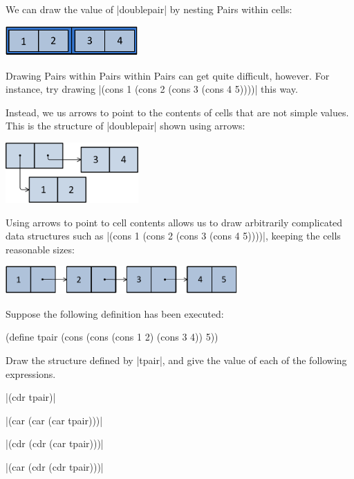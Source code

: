 \begin{schemeregion}
We can draw the value of \scheme|doublepair| by nesting Pairs within cells:
\begin{centernospace}
\includegraphics[width=2.0in]{figures/doublepair.pdf}
\end{centernospace}

Drawing Pairs within Pairs within Pairs can get quite difficult, however.  For instance, try drawing \scheme|(cons 1 (cons 2 (cons 3 (cons 4 5))))| this way.

Instead, we us arrows to point to the contents of cells that are not simple values.  This is the structure of \scheme|doublepair| shown using arrows:
\begin{centernospace}
\includegraphics[width=2.0in]{figures/doublepair-arrows.png}
\end{centernospace}

Using arrows to point to cell contents allows us to draw arbitrarily complicated data structures such as \scheme|(cons 1 (cons 2 (cons 3 (cons 4 5))))|, keeping the cells reasonable sizes:
\begin{centernospace}
\includegraphics[width=3.5in]{figures/cons12345.pdf}
\end{centernospace}

\beforeex
\begin{exercise}
Suppose the following definition has been executed:
\begin{schemedisplay}
(define tpair 
  (cons (cons (cons 1 2) (cons 3 4)) 
        5))
\end{schemedisplay}
Draw the structure defined by \scheme|tpair|, and give the value of each of the following expressions.
\begin{subexerciselist}
\item \scheme|(cdr tpair)|
\solution{\LATER{}}
\item \scheme|(car (car (car tpair)))|
\solution{\LATER{}}
\item \scheme|(cdr (cdr (car tpair)))|
\solution{\LATER{}}
\item \scheme|(car (cdr (cdr tpair)))|
\solution{\LATER{}}
\end{subexerciselist}
\end{exercise}
\afterex


\end{schemeregion}
